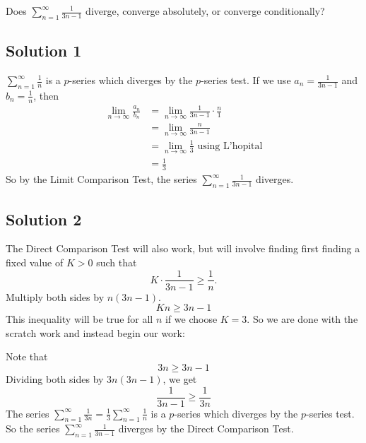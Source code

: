 \documentclass{article}
\begin{document}
\noindent
Does $\displaystyle \sum_{n=1}^\infty \frac{1}{3n-1}$
diverge, converge absolutely, or converge conditionally?

\subsection*{Solution 1}

$\displaystyle \sum_{n=1}^\infty \frac1{n}$ is a $p$-series which diverges by the $p$-series test. If we use $a_n = \frac{1}{3n-1}$ and $b_n = \frac1{n}$, then
\begin{align*}
\lim_{n \to \infty} \frac{a_n}{b_n}
&= \lim_{n \to \infty} \frac{1}{3n-1} \cdot \frac{n}{1}\\
&= \lim_{n \to \infty} \frac{n}{3n-1} \\
&= \lim_{n \to \infty} \frac13 \text{ using L'hopital}\\
&= \frac13
\end{align*}
So by the Limit Comparison Test, the series $\displaystyle \sum_{n=1}^\infty \frac{1}{3n-1}$ diverges.

\subsection*{Solution 2}

The Direct Comparison Test will also work, but will involve finding first finding a fixed value of $K > 0$ such that
\[ K \cdot \frac{1}{3n-1} \geq \frac1n.\]
Multiply both sides by $n(3n-1)$.
\[ Kn \geq 3n-1\]
This inequality will be true for all $n$ if we choose $K=3$.
So we are done with the scratch work and instead begin our work:

Note that
\[ 3n \geq 3n-1\]
Dividing both sides by $3n(3n-1)$, we get
\[ \frac{1}{3n-1} \geq \frac1{3n}\]
The series $\displaystyle \sum_{n=1}^\infty \frac1{3n} = \frac13\sum_{n=1}^\infty \frac1{n}$ is a $p$-series which diverges by the $p$-series test. So the series $\displaystyle \sum_{n=1}^\infty \frac1{3n-1}$ diverges by the Direct Comparison Test.
\end{document}
